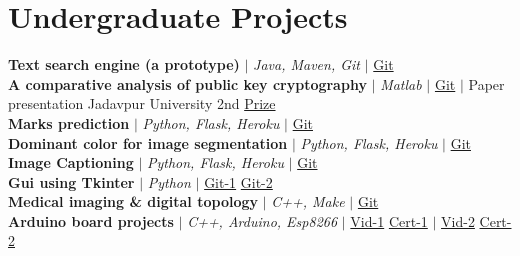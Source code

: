 \documentclass[letterpaper,11pt]{article}
\begin{document}
\section{\small Undergraduate Projects}
 \begin{itemize}[leftmargin=0.15in, label={}]
    \small{\item{\textbf{\footnotesize Text search engine (a prototype)} $|$ \emph{\footnotesize{Java, Maven, Git}} $|$ {\href{https://github.com/Soham-coder/search_engine}{\color{blue}\scriptsize Git}}\\
     
     \textbf{{\footnotesize A comparative analysis of public key cryptography}}  $|$ \emph{\footnotesize {Matlab}} $|$ {\href{https://github.com/Soham-coder/ecc_vs_rsa}{\color{blue}\scriptsize Git}} $|$ {\scriptsize Paper presentation Jadavpur University 2nd {\href{https://github.com/Soham-coder/ecc_vs_rsa#prizes}{\color{blue}\scriptsize Prize}}}\\
     
     \textbf{{\footnotesize Marks prediction}}  $|$ \emph{\footnotesize {Python, Flask, Heroku}} $|$ {\href{https://github.com/Soham-coder/marks-prediction}{\color{blue}\scriptsize Git}} \\
     
     \textbf{{\footnotesize Dominant color for image segmentation}}  $|$ \emph{\footnotesize {Python, Flask, Heroku}} $|$ {\href{https://github.com/Soham-coder/img_seg_heroku_app}{\color{blue}\scriptsize Git}} \\
     
     \textbf{{\footnotesize Image Captioning}}  $|$ \emph{\footnotesize {Python, Flask, Heroku}} $|$ {\href{https://github.com/Soham-coder/image_caption}{\color{blue}\scriptsize Git}} \\
     
     \textbf{{\footnotesize Gui using Tkinter}}  $|$ \emph{\footnotesize {Python}} $|$ {\href{https://github.com/Soham-coder/Bill-Generator}{\color{blue}\scriptsize Git-1}} {\href{https://github.com/Soham-coder/Calculator-using-tkinter}{\color{blue}\scriptsize Git-2}} \\
     
     \textbf{{\footnotesize Medical imaging \&
     digital topology}}  $|$ \emph{\footnotesize {C++, Make}} $|$ {\href{https://github.com/Soham-coder/medical_imaging}{\color{blue}\scriptsize Git}} \\
     
     \textbf{{\footnotesize Arduino board projects}}  $|$ \emph{\footnotesize {C++, Arduino, Esp8266}} $|$ {\href{https://www.youtube.com/watch?v=7yWR7CL9m3w&feature=youtu.be}{\color{blue}\scriptsize Vid-1}} {\href{https://drive.google.com/file/d/1PNM0LzigY5FUSaTKZBZJa-X5OQrXwD4Y/view}{\color{blue}\scriptsize Cert-1}} $|$ {\href{https://www.youtube.com/watch?v=Wtf5PLIAQfY&feature=youtu.be}{\color{blue}\scriptsize Vid-2}} {\href{https://drive.google.com/file/d/1urykb10Jwh4sXYTcA1wyC4tu-bMqZyBt/view}{\color{blue}\scriptsize Cert-2}}  \\
     
    
     }}
 \end{itemize} 
\end{document}
